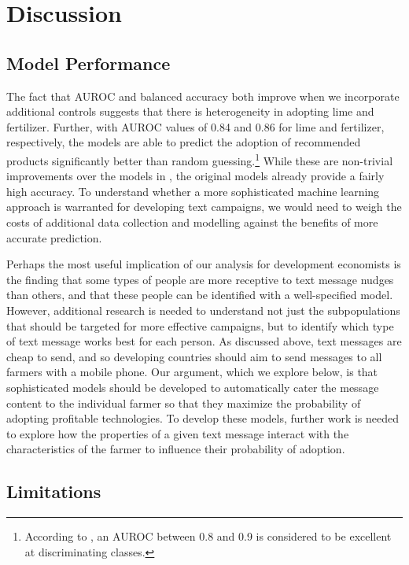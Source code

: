 \documentclass[12pt]{article}
\begin{document}
\section{Discussion}
\label{section:discussion}

\subsection{Model Performance}
The fact that AUROC and balanced accuracy both improve when we incorporate additional controls suggests that there is heterogeneity in adopting lime and fertilizer. Further, with AUROC values of 0.84 and 0.86 for lime and fertilizer, respectively, the models are able to predict the adoption of recommended products significantly better than random guessing.\footnote{According to \textcite{mandrekar_receiver_2010}, an AUROC between 0.8 and 0.9 is considered to be excellent at discriminating classes.} While these are non-trivial improvements over the models in \textcite{fabregas_digital_2025}, the original models already provide a fairly high accuracy. To understand whether a more sophisticated machine learning approach is warranted for developing text campaigns, we would need to weigh the costs of additional data collection and modelling against the benefits of more accurate prediction.

Perhaps the most useful implication of our analysis for development economists is the finding that some types of people are more receptive to text message nudges than others, and that these people can be identified with a well-specified model. However, additional research is needed to understand not just the subpopulations that should be targeted for more effective campaigns, but to identify which type of text message works best for each person. As discussed above, text messages are cheap to send, and so developing countries should aim to send messages to all farmers with a mobile phone. Our argument, which we explore below, is that sophisticated models should be developed to automatically cater the message content to the individual farmer so that they maximize the probability of adopting profitable technologies. To develop these models, further work is needed to explore how the properties of a given text message interact with the characteristics of the farmer to influence their probability of adoption.

\subsection{Limitations}
\end{document}
